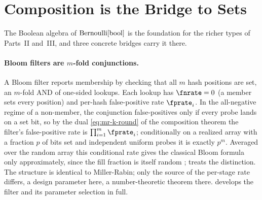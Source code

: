 %
%
%
%

\section{Composition is the Bridge to Sets}
\label{sec:bridge-to-sets}

The Boolean algebra of $\mathrm{Bernoulli}[\mathrm{bool}]$ is the foundation for the
richer types of Parts~II and~III, and three concrete bridges carry it there.

\paragraph{Bloom filters are $m$-fold conjunctions.}
A Bloom filter reports membership by checking that all
$m$ hash positions are set, an $m$-fold AND of one-sided lookups. Each lookup
has $\fnrate = 0$ (a member sets every position) and per-hash false-positive
rate $\fprate_i$. In the all-negative regime of a non-member, the conjunction
false-positives only if every probe lands on a set bit, so by the dual
\eqref{eq:mr-k-round} of the composition theorem the filter's false-positive
rate is $\prod_{i=1}^{m} \fprate_i$; conditionally on a realized array with a
fraction $p$ of bits set and independent uniform probes it is exactly $p^m$.
Averaged over the random array this conditional rate gives the classical Bloom
formula only approximately, since the fill fraction is itself random
\parencite{bose-et-al-2008,christensen-roginsky-jimeno-2010};
 treats the distinction. The structure is identical to Miller-Rabin; only the source of the
per-stage rate differs, a design parameter here, a number-theoretic theorem
there.  develops the filter and its parameter
selection in full.

